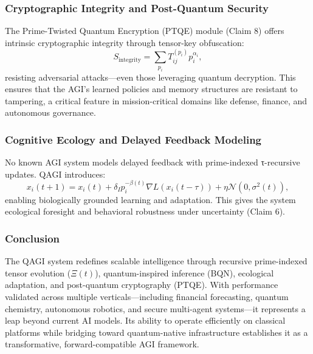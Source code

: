 \documentclass{article}
\theoremstyle{plain}
\theoremstyle{claimstyle}
\begin{document}
\subsubsection{Cryptographic Integrity and Post-Quantum Security}

The Prime-Twisted Quantum Encryption (PTQE) module (Claim 8) offers intrinsic cryptographic integrity through tensor-key obfuscation:
\[
S_{\text{integrity}} = \sum_{p_i} T_{ij}^{(p_i)} p_i^{\alpha_i},
\]
resisting adversarial attacks—even those leveraging quantum decryption. This ensures that the AGI’s learned policies and memory structures are resistant to tampering, a critical feature in mission-critical domains like defense, finance, and autonomous governance.

\subsubsection{Cognitive Ecology and Delayed Feedback Modeling}

No known AGI system models delayed feedback with prime-indexed τ-recursive updates. QAGI introduces:
\[
x_i(t+1) = x_i(t) + \delta_I p_i^{-\beta(t)} \nabla L(x_i(t - \tau)) + \eta \mathcal{N}(0, \sigma^2(t)),
\]
enabling biologically grounded learning and adaptation. This gives the system ecological foresight and behavioral robustness under uncertainty (Claim 6).

\subsubsection{Conclusion}

The QAGI system redefines scalable intelligence through recursive prime-indexed tensor evolution ($\Xi(t)$), quantum-inspired inference (BQN), ecological adaptation, and post-quantum cryptography (PTQE). With performance validated across multiple verticals—including financial forecasting, quantum chemistry, autonomous robotics, and secure multi-agent systems—it represents a leap beyond current AI models. Its ability to operate efficiently on classical platforms while bridging toward quantum-native infrastructure establishes it as a transformative, forward-compatible AGI framework.

\nolinenumbers
\nocite{*}


\end{document}
